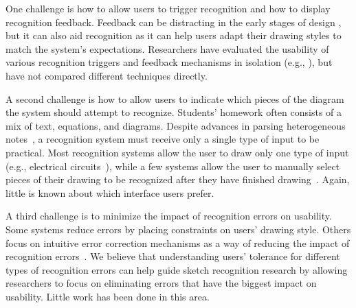 \documentclass{egpubl}
\begin{document}
One challenge is how to allow users to trigger recognition and how to
display recognition feedback.  Feedback can be distracting in the
early stages of design \cite{Hong2002Sketch}, but it can also aid
recognition as it can help users adapt their drawing styles to match
the system's expectations.  Researchers have evaluated the usability
of various recognition triggers and feedback mechanisms in isolation
(e.g.,
\cite{Alvarado2001Preserving,Newman2003Denim,LaViola2006Initial}), but
have not compared different techniques directly.

A second challenge is how to allow users to indicate which pieces
of the diagram the system should attempt to recognize.  Students'
homework often consists of a mix of text, equations, and
diagrams. Despite advances in parsing heterogeneous
notes~\cite{Wang2006Parsing}, a recognition system must receive only a
single type of input to be practical.  Most recognition systems allow
the user to draw only one type of input (e.g., electrical
circuits~\cite{Gennari2005Combining}), while a few systems allow the
user to manually select pieces of their drawing to be recognized after
they have finished drawing~\cite{LaViola2006Initial}.  Again, little
is known about which interface users prefer.

A third challenge is to minimize the impact of recognition errors on
usability.  Some systems reduce errors by placing constraints on
users' drawing style.  Others focus on intuitive error correction
mechanisms as a way of reducing the impact of recognition
errors~\cite{Mankoff2000Providing}.  We believe that understanding
users' tolerance for different types of recognition errors can help
guide sketch recognition research by allowing researchers to focus on
eliminating errors that have the biggest impact on usability.  Little
work has been done in this area.



  
\end{document}
